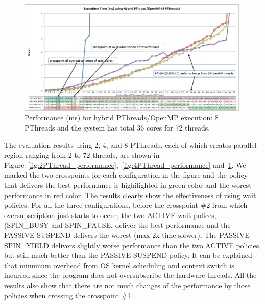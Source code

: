 \begin{figure}[h]
    \includegraphics[width=0.99\textwidth] {images/8PThread_performance}
    \caption{Performance (ms) for hybrid PThreads/OpenMP execution: 8 PThreads and the system has total 36 cores for 72 threads.}
    \label{fig:8PThread_performance}
\end{figure}

The evaluation results using 2, 4, and 8 PThreads, each of which creates {\sf parallel} region ranging 
from 2 to 72 threads, are shown in Figure~\ref{fig:2PThread_performance},~\ref{fig:4PThread_performance} 
and~\ref{fig:8PThread_performance}. We marked the two crosspoints for each configuration in the figure and the 
policy that delivers the best performance is highilighted in green color and the worest performance in red color.
The results clearly show the effectiveness of using wait policies. For all the three configurations, 
before the crosspoint \#2 from which oversubscription just starts to occur, 
the two {\sf ACTIVE} wait polices, ({\sf SPIN\_BUSY} and {\sf SPIN\_PAUSE}, deliver the best performance and 
the {\sf PASSIVE SUSPEND} delivers the worest (max 2x time slower). 
The {\sf PASSIVE SPIN\_YIELD} delivers slightly worse performance than the two {\sf ACTIVE} policies, but still much better than the 
{\sf PASSIVE SUSPEND} policy. 
It can be explained that minumum overhead from OS kernel scheduling and context switch is incurred since 
the program does not oversubscribe the hardware threads. 
All the results also show that there are not much changes of the performance by those policies when crossing the crosspoint \#1. 

